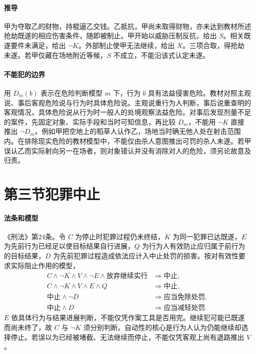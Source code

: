 \paragraph{推导}
甲为夺取乙的财物，持棍逼乙交钱。乙抵抗，甲尚未取得财物，亦未达到教材所述抢劫既遂的相应伤害条件，随即被制止。甲开始以威胁压制反抗，给出 \(S\)。相关既遂要件未满足，给出 \(\neg K\)。外部制止使甲无法继续，给出 \(X\)。三项合取，得抢劫未遂。若甲仅藏在场地附近等候，\(S\) 不成立，不能沿该式认定未遂。

\paragraph{不能犯的边界}
用 \(D_m(b)\) 表示在危险判断模型 \(m\) 下，行为 \(b\) 具有法益侵害危险。教材对照主观说、事后客观危险说与行为时具体危险说。主观说重行为人判断，事后说重查明的客观情况，具体危险说从行为时一般人的处境观察法益危险。对事后发现剂量不足的案件，先固定对象、实际手段和当时可知信息，再比较 \(D_m\)，不能用 \(\neg K\) 直接推出 \(\neg D_m\)。例如甲把空地上的稻草人认作乙，场地当时确无他人处在射击范围内。在排除现实危险的教材模型中，不能仅由杀人意图推出可罚的杀人未遂。若甲误认乙而实际射向另一在场者，则对象错认并没有消除对人的危险，须另论故意及归责。

\section{第三节\quad 犯罪中止}

\paragraph{法条和模型}
《刑法》第24条。令 \(C\) 为停止时犯罪过程仍未终结，\(K\) 为同一犯罪已达既遂，\(E\) 为先前行为已经足以使目标结果自行进展，\(Q\) 为行为人有效防止应归属于前行为的目标结果，\(D\) 为先前犯罪过程造成依法应计入中止处罚的损害。按对有效性要求实际阻止作用的模型，
\[
\begin{aligned}
C\land\neg K\land V\land\neg E\land\text{放弃继续实行}
    &\Longrightarrow \text{中止},\\
C\land\neg K\land V\land E\land Q
    &\Longrightarrow \text{中止},\\
\text{中止}\land\neg D &\Longrightarrow \text{应当免除处罚},\\
\text{中止}\land D &\Longrightarrow \text{应当减轻处罚}.
\end{aligned}
\]
\(E\) 依具体行为与结果进展判断，不能仅凭作案工具是否用完。继续犯可能已既遂而尚未终了，故 \(C\) 与 \(\neg K\) 须分别判断。自动性的核心是行为人认为仍能继续却选择停止。若误以为已经被堵截、无法继续而停止，不能仅凭客观上尚有退路推出 \(V\)。

